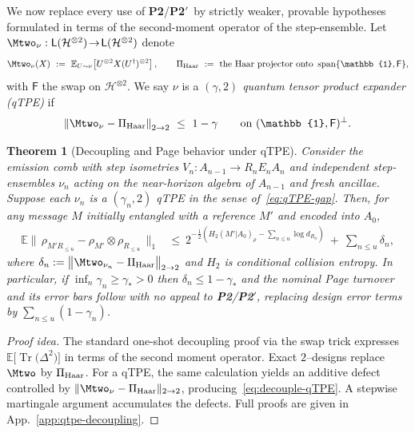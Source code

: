 \documentclass[aps,prd,preprint,onecolumn,superscriptaddress,nofootinbib,longbibliography,floatfix,11pt,showpacs,showkeys]{revtex4-2}
\newcommand{\Ptwo}{\textbf{P2}\xspace}
\newcommand{\PtwoPrime}{\textbf{P2$'$}\xspace}
\theoremstyle{plain}
\newtheorem{theorem}{Theorem}
\theoremstyle{definition}
\theoremstyle{remark}
\begin{document}
We now replace every use of \Ptwo/\PtwoPrime\ by strictly weaker, provable hypotheses formulated in terms of the second-moment operator of the step-ensemble. Let $\Mtwo_\nu:\mathsf{L}(\mathcal{H}^{\otimes 2})\!\to\!\mathsf{L}(\mathcal{H}^{\otimes 2})$ denote
\begin{equation}
\Mtwo_\nu(X)\ :=\ \mathbb{E}_{U\sim \nu}\!\left[U^{\otimes 2} X (U^\dagger)^{\otimes 2}\right],\qquad
\Pi_{\rm Haar}\ :=\ \text{the Haar projector onto }\operatorname{span}\{ \mathbb{1},\mathsf{F}\},
\end{equation}
with $\mathsf{F}$ the swap on $\mathcal{H}^{\otimes 2}$. We say $\nu$ is a \emph{$(\gamma,2)$ quantum tensor product expander (qTPE)} if
\begin{equation}\label{eq:qTPE-gap}
\left\| \Mtwo_\nu-\Pi_{\rm Haar}\right\|_{2\to 2}\ \le\ 1-\gamma\qquad\text{on }(\mathbb{1},\mathsf{F})^\perp.
\end{equation}

\begin{theorem}[Decoupling and Page behavior under qTPE]\label{thm:qtpe-page}
Consider the emission comb with step isometries $V_n:A_{n-1}\!\to\! R_n E_n A_n$ and independent step-ensembles $\nu_n$ acting on the near-horizon algebra of $A_{n-1}$ and fresh ancillae. Suppose each $\nu_n$ is a $(\gamma_n,2)$ qTPE in the sense of~\eqref{eq:qTPE-gap}. Then, for any message $M$ initially entangled with a reference $M'$ and encoded into $A_0$,
\begin{align}
\mathbb{E}\big\|\,\rho_{M' R_{\le u}}-\rho_{M'}\!\otimes\!\rho_{R_{\le u}}\,\big\|_1
&\le\ 2^{-\frac12\!\left(H_2(M'|A_0)_\rho-\sum_{n\le u}\!\log d_{R_n}\right)}\ +\ \sum_{n\le u}\delta_n,\label{eq:decouple-qTPE}
\end{align}
where $\delta_n:=\big\|\Mtwo_{\nu_n}-\Pi_{\rm Haar}\big\|_{2\to 2}$ and $H_2$ is conditional collision entropy. In particular, if $\inf_n\gamma_n\ge \gamma_*>0$ then $\delta_n\le 1-\gamma_*$ and the nominal Page turnover and its error bars follow with \emph{no} appeal to \Ptwo/\PtwoPrime, replacing design error terms by $\sum_{n\le u}(1-\gamma_n)$.
\end{theorem}
\begin{proof}[Proof idea]
The standard one-shot decoupling proof via the swap trick expresses $\mathbb{E}\!\big[\operatorname{Tr}\big(\Delta^2\big)\big]$ in terms of the second moment operator. Exact $2$--designs replace $\Mtwo$ by $\Pi_{\rm Haar}$. For a qTPE, the same calculation yields an additive defect controlled by $\|\Mtwo_\nu-\Pi_{\rm Haar}\|_{2\to 2}$, producing~\eqref{eq:decouple-qTPE}. A stepwise martingale argument accumulates the defects. Full proofs are given in App.~\ref{app:qtpe-decoupling}.
\end{proof}
\end{document}

